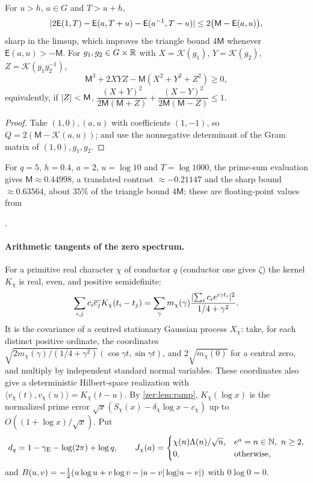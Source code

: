 \begin{corollary}\label{zer:cor:sharpwin}
For $u>h$, $a\in G$ and $T>u+h$,
\[
 \lvert2\mathsf E(1,T)-\mathsf E(a,T+u)-\mathsf E(a^{-1},T-u)\rvert\le2\bigl(\mathsf M-\mathsf E(a,u)\bigr),
\]
sharp in the limsup, which improves the triangle bound $4\mathsf M$ whenever $\mathsf E(a,u)>-\mathsf M$.
For $g_1,g_2\in G\times\mathbb{R}$ with $X=\mathcal K(g_1)$, $Y=\mathcal K(g_2)$, $Z=\mathcal K(g_1g_2^{-1})$,
\[
 \mathsf M^3+2XYZ-\mathsf M(X^2+Y^2+Z^2)\ge0,
\]
equivalently, if $\lvert Z\rvert<\mathsf M$, $\dfrac{(X+Y)^2}{2\mathsf M(\mathsf M+Z)}+\dfrac{(X-Y)^2}{2\mathsf M(\mathsf M-Z)}\le1$.
\end{corollary}
\begin{proof}
Take $(1,0),(a,u)$ with coefficients $(1,-1)$, so $Q=2(\mathsf M-\mathcal K(a,u))$; and use the
nonnegative determinant of the Gram matrix of $(1,0),g_1,g_2$.
\end{proof}

For $q=5$, $h=0.4$, $a=2$, $u=\log10$ and $T=\log1000$, the prime-sum evaluation gives
$\mathsf M\approx0.44998$, a translated contrast $\approx-0.21147$ and the sharp bound $\approx0.63564$,
about $35\%$ of the triangle bound $4\mathsf M$; these are floating-point values from
\begin{center}.\end{center}

\paragraph{Arithmetic tangents of the zero spectrum.}
For a primitive real character $\chi$ of conductor $q$ (conductor one gives $\zeta$) the kernel
$K_\chi$ is real, even, and positive semidefinite:
\[
 \sum_{i,j}c_i\overline{c_j}K_\chi(t_i-t_j)=\sum_\gamma m_\chi(\gamma)\frac{\lvert\sum_ic_ie^{i\gamma t_i}\rvert^2}{1/4+\gamma^2}.
\]
It is
the covariance of a centred stationary Gaussian process $X_\chi$: take, for each distinct
positive ordinate, the coordinates $\sqrt{2m_\chi(\gamma)/(1/4+\gamma^2)}(\cos\gamma t,\sin\gamma t)$, and
$2\sqrt{m_\chi(0)}$ for a central zero, and multiply by independent standard normal variables.
These coordinates also give a deterministic Hilbert-space realization with
$\langle v_\chi(t),v_\chi(u)\rangle=K_\chi(t-u)$. By \cref{zer:lem:ramp}, $K_\chi(\log x)$ is the
normalized prime error $\sqrt x(S_\chi(x)-\delta_\chi\log x-c_\chi)$ up to $O((1+\log x)/\sqrt x)$. Put
\[
 d_q=1-\zergE-\log(2\pi)+\log q,\qquad J_\chi(a)=\begin{cases}\chi(n)\Lambda(n)/\sqrt n,&e^a=n\in\N,\ n\ge2,\\0,&\text{otherwise},\end{cases}
\]
and $B(u,v)=-\tfrac12(u\log u+v\log v-\lvert u-v\rvert\log\lvert u-v\rvert)$ with $0\log0=0$.

